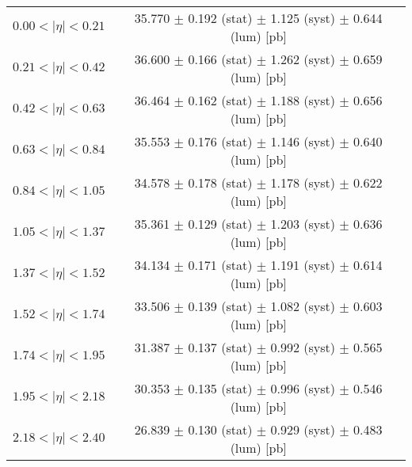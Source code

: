 \begin{tabular}{lc}
\hline
$0.00 < |\eta| <0.21$          & 35.770 $\pm$ 0.192 (stat) $\pm$ 1.125 (syst) $\pm$ 0.644 (lum) [pb]  \\
$0.21 < |\eta| <0.42$          & 36.600 $\pm$ 0.166 (stat) $\pm$ 1.262 (syst) $\pm$ 0.659 (lum) [pb]  \\
$0.42 < |\eta| <0.63$          & 36.464 $\pm$ 0.162 (stat) $\pm$ 1.188 (syst) $\pm$ 0.656 (lum) [pb]  \\
$0.63 < |\eta| <0.84$          & 35.553 $\pm$ 0.176 (stat) $\pm$ 1.146 (syst) $\pm$ 0.640 (lum) [pb]  \\
$0.84 < |\eta| <1.05$          & 34.578 $\pm$ 0.178 (stat) $\pm$ 1.178 (syst) $\pm$ 0.622 (lum) [pb]  \\
$1.05 < |\eta| <1.37$          & 35.361 $\pm$ 0.129 (stat) $\pm$ 1.203 (syst) $\pm$ 0.636 (lum) [pb]  \\
$1.37 < |\eta| <1.52$          & 34.134 $\pm$ 0.171 (stat) $\pm$ 1.191 (syst) $\pm$ 0.614 (lum) [pb]  \\
$1.52 < |\eta| <1.74$          & 33.506 $\pm$ 0.139 (stat) $\pm$ 1.082 (syst) $\pm$ 0.603 (lum) [pb]  \\
$1.74 < |\eta| <1.95$          & 31.387 $\pm$ 0.137 (stat) $\pm$ 0.992 (syst) $\pm$ 0.565 (lum) [pb]  \\
$1.95 < |\eta| <2.18$          & 30.353 $\pm$ 0.135 (stat) $\pm$ 0.996 (syst) $\pm$ 0.546 (lum) [pb]  \\
$2.18 < |\eta| <2.40$          & 26.839 $\pm$ 0.130 (stat) $\pm$ 0.929 (syst) $\pm$ 0.483 (lum) [pb]  \\
\hline
\end{tabular}
